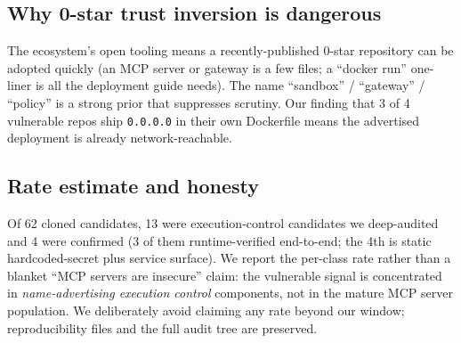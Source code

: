 \documentclass{llncs}
\begin{document}
\subsection{Why 0-star trust inversion is dangerous}\label{sub:why}
The ecosystem's open tooling means a recently-published 0-star repository can be adopted quickly (an MCP server or gateway is a few files; a ``docker run'' one-liner is all the deployment guide needs). The name ``sandbox'' / ``gateway'' / ``policy'' is a strong prior that suppresses scrutiny. Our finding that 3 of 4 vulnerable repos ship \texttt{0.0.0.0} in their own Dockerfile means the advertised deployment is already network-reachable.

\subsection{Rate estimate and honesty}\label{sub:rate}
Of 62 cloned candidates, 13 were execution-control candidates we deep-audited and 4 were confirmed (3 of them runtime-verified end-to-end; the 4th is static hardcoded-secret plus service surface). We report the per-class rate rather than a blanket ``MCP servers are insecure'' claim: the vulnerable signal is concentrated in \emph{name-advertising execution control} components, not in the mature MCP server population. We deliberately avoid claiming any rate beyond our window; reproducibility files and the full audit tree are preserved.
\end{document}
